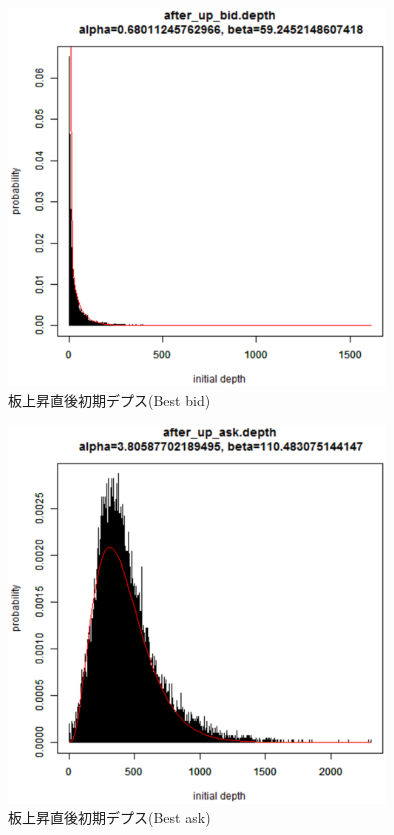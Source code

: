\documentclass[a4j,papersize,disablejfam,slide,14pt]{jsarticle}
\begin{document}
    \begin{figure}[H]
        \begin{center}
    	\includegraphics[clip,width = 10.0cm]{graphics/after_up_bid.depth.eps}
        \end{center}
        \caption{板上昇直後初期デプス({\rm Best bid})}
    \end{figure}
    \begin{figure}[H]
        \begin{center}
    	\includegraphics[clip,width = 10.0cm]{graphics/after_up_ask.depth.eps}
        \end{center}
        \caption{板上昇直後初期デプス({\rm Best ask})}
    \end{figure}
\end{document}
